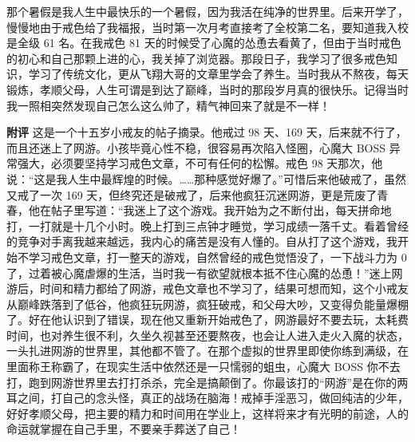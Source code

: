 \begin{case}
    那个暑假是我人生中最快乐的一个暑假，因为我活在纯净的世界里。后来开学了，慢慢地由于戒色给了我福报，当时第一次月考直接考了全校第二名，要知道我入校是全级 61 名。在我戒色 81 天的时候受了心魔的怂恿去看黄了，但由于当时戒色的初心和自己那颗上进的心，我关掉了浏览器。那段日子，我学习了很多戒色知识，学习了传统文化，更从飞翔大哥的文章里学会了养生。当时我从不熬夜，每天锻炼，孝顺父母，人生可谓是到达了巅峰，当时的那段岁月真的很快乐。记得当时我一照相突然发现自己怎么这么帅了，精气神回来了就是不一样！

    \textbf{附评} 这是一个十五岁小戒友的帖子摘录。他戒过 98 天、169 天，后来就不行了，而且还迷上了网游。小孩毕竟心性不稳，很容易再次陷入怪圈，心魔大 BOSS 异常强大，必须要坚持学习戒色文章，不可有任何的松懈。戒色 98 天那次，他说：“这是我人生中最辉煌的时候。……那种感觉好爆了。”可惜后来他破戒了，虽然又戒了一次 169 天，但终究还是破戒了，后来他疯狂沉迷网游，更是荒废了青春，他在帖子里写道：“我迷上了这个游戏。我开始为之不断付出，每天拼命地打，一打就是十几个小时。晚上打到三点钟才睡觉，学习成绩一落千丈。看着曾经的竞争对手离我越来越远，我内心的痛苦是没有人懂的。自从打了这个游戏，我开始不学习戒色文章，打一整天的游戏，自然曾经的戒色觉悟没了，一下战斗力为 0 了，过着被心魔虐爆的生活，当时我一有欲望就根本抵不住心魔的怂恿！”迷上网游后，时间和精力都给了网游，戒色文章也不学习了，结果可想而知，这个小戒友从巅峰跌落到了低谷，他疯狂玩网游，疯狂破戒，和父母大吵，又变得负能量爆棚了。好在他认识到了错误，现在他又重新开始戒色了，网游最好不要去玩，太耗费时间，也对养生很不利，久坐久视甚至还要熬夜，也会让人进入走火入魔的状态，一头扎进网游的世界里，其他都不管了。在那个虚拟的世界里即使你练到满级，在里面称王称霸了，在现实生活中依然还是一只懦弱的蛆虫，心魔大 BOSS 你不去打，跑到网游世界里去打打杀杀，完全是搞颠倒了。你最该打的“网游”是在你的两耳之间，打自己的念头怪，真正的战场在脑海！戒掉手淫恶习，做回纯洁的少年，好好孝顺父母，把主要的精力和时间用在学业上，这样将来才有光明的前途，人的命运就掌握在自己手里，不要亲手葬送了自己！
\end{case}

